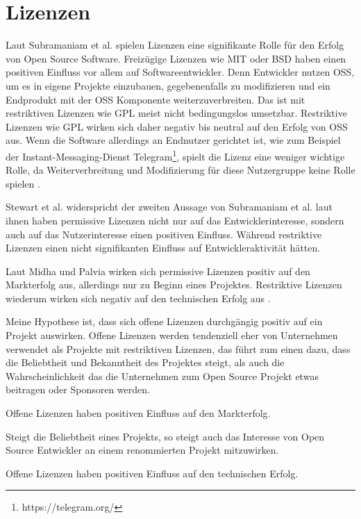 \section{Lizenzen} \label{sec:Lizenzen}

Laut Subramaniam et al. spielen Lizenzen eine signifikante Rolle für den Erfolg von
Open Source Software.
Freizügige Lizenzen wie MIT oder BSD haben einen positiven Einfluss vor allem auf Softwareentwickler.
Denn Entwickler nutzen OSS, um es in eigene Projekte einzubauen, gegebenenfalls zu modifizieren
und ein Endprodukt mit der OSS Komponente weiterzuverbreiten. Das ist mit restriktiven Lizenzen
wie GPL meist nicht bedingungslos umsetzbar. Restriktive Lizenzen wie GPL wirken sich daher
negativ bis neutral auf den Erfolg von OSS aus. Wenn die Software allerdings an Endnutzer
gerichtet ist, wie zum Beispiel der Instant-Messaging-Dienst Telegram\footnote{https://telegram.org/},
spielt die Lizenz eine weniger wichtige Rolle, da Weiterverbreitung und Modifizierung für diese Nutzergruppe
keine Rolle spielen \cite{subramaniamDeterminantsOpenSource2009}.

Stewart et al. widerspricht der zweiten Aussage von Subramaniam et al. laut ihnen
haben permissive Lizenzen nicht nur auf das Entwicklerinteresse, sondern auch auf das
Nutzerinteresse einen positiven Einfluss. %
Während restriktive Lizenzen einen nicht signifikanten Einfluss auf
Entwickleraktivität hätten. \cite{stewartImpactsLicenseChoice2006a}

Laut Midha und Palvia wirken sich permissive Lizenzen positiv auf den Markterfolg aus, allerdings
nur zu Beginn eines Projektes. %
Restriktive Lizenzen wiederum wirken sich negativ auf den technischen Erfolg aus %
\cite{midhaFactorsAffectingSuccess2012}.


Meine Hypothese ist, dass sich offene Lizenzen durchgängig positiv auf ein Projekt auswirken.
Offene Lizenzen werden tendenziell eher von Unternehmen verwendet als Projekte mit restriktiven
Lizenzen, das führt zum einen dazu, dass die Beliebtheit und Bekanntheit des Projektes steigt, als
auch die Wahrscheinlichkeit das die Unternehmen zum Open Source Projekt etwas beitragen oder
Sponsoren werden.

\begin{hypothesis}
    Offene Lizenzen haben positiven Einfluss auf den Markterfolg.
    \label{H:1}
\end{hypothesis}

\noindent
Steigt die Beliebtheit eines Projekts, so steigt auch das Interesse von Open Source Entwickler an
einem renommierten Projekt mitzuwirken.

\begin{hypothesis}
    Offene Lizenzen haben positiven Einfluss auf den technischen Erfolg.
    \label{H:2}
\end{hypothesis}